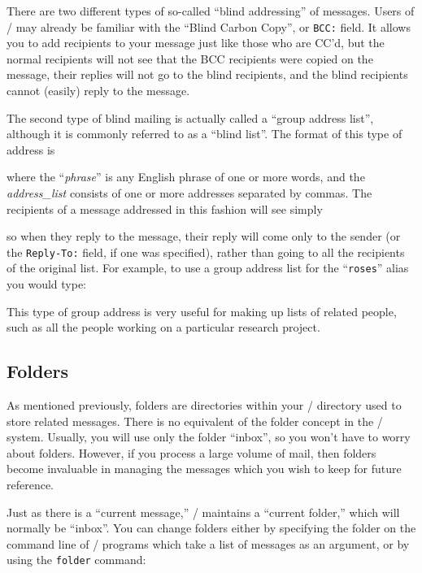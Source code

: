 There are two different types of so-called ``blind addressing'' of messages.
Users of \MM/ may already be familiar with the ``Blind Carbon Copy'', or
{\tt BCC:} field.  It allows you to add recipients to your message just
like those who are CC'd, but the normal recipients will not see that the
BCC recipients were copied on the message, their replies will not go to the
blind recipients, and the blind recipients cannot (easily) reply to the
message.

The second type of blind mailing is actually called a ``group address list'',
although it is commonly referred to as a ``blind list''.
The format of this type of address is


where the ``{\it phrase\/}'' is any English phrase of one or more words,
and the {\it address\_list\/} consists of one or more addresses separated by
commas.  The recipients of a message addressed in this fashion will
see simply


so when they reply to the message, their reply will come only to the sender
(or the {\tt Reply-To:} field, if one was specified), rather than going to
all the recipients of the original list. For example, to use a group
address list for the ``{\tt roses}'' alias you would type:


This type of group address is very
useful for making up lists of related people, such as all the people working
on a particular research project.

\subsection{Folders}\label{Folders}

As mentioned previously, folders are directories within your \MH/ directory
used to store related messages.  There is no equivalent of the folder
concept in the \MM/ system. Usually, you will use only the folder ``inbox'',
so you won't have to worry about folders.  However, if you process a large
volume of mail, then folders become invaluable in managing the messages
which you wish to keep for future reference.

Just as there is a ``current message,'' \MH/ maintains a ``current folder,''
which will normally be ``inbox''.  You can change folders either by
specifying the folder on the command line of \MH/ programs which take a
list of messages as an argument, or by using the {\tt folder} command:

